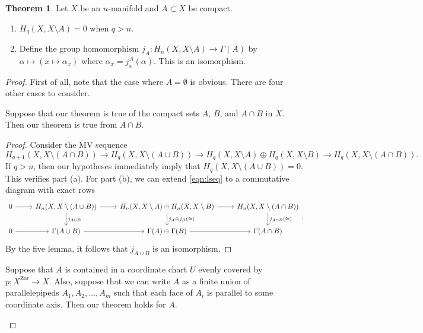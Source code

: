 \documentclass[10pt,letterpaper,cm]{nupset}
\theoremstyle{definition}
\theoremstyle{theorem}
\newtheorem{theorem}[definition]{Theorem}
\theoremstyle{remark}
\newcommand{\1}{\mathbb{1}}
\newcommand{\0}{\vec 0}
\begin{document}
\begin{theorem}
Let $X$ be an $n$-manifold and $A \subset X$ be compact.
\begin{enumerate}[label=(\alph*)]
\item $H_q(X, X \setminus A) =0$ when $q>n$.
\item Define the group homomorphism $j_A : H_n(X, X \setminus A) \to \Gamma(A)$ by $\alpha \mapsto \left(x \mapsto \alpha_x\right)$ where $\alpha_x = j_x^A(\alpha)$. This is an isomorphism.
\end{enumerate}
\end{theorem}
\begin{proof}  First of all, note that the case where $A = \emptyset$ is obvious. There are four other cases to consider. 
\begin{steps}
\item Suppose that our theorem is true of the compact sets $A$, $B$, and $A \cap B$ in $X$. Then our theorem is true from $A \cap B$.
\begin{proof}
Consider the MV sequence
\[ \label{eqn:lseq}
{H_{q+1}(X, X \setminus (A \cap B))} \to  {H_q(X, X \setminus (A \cup B))} \to {H_q(X, X \setminus A)\oplus H_q(X, X \setminus B)} \to {H_q(X, X \setminus (A \cap B))}
.\tag{$\star$}\] If $ q>n$, then our hypotheses immediately imply that $H_q(X, X \setminus (A \cup B)) =0$. This verifies part (a). For part (b), we can extend \eqref{eqn:lseq} to a commutative diagram with exact rows
\[
\begin{tikzcd}
0 \arrow[r] & {H_n(X, X \setminus (A \cup B))} \arrow[r] \arrow[d, "j_{A\cup B}"] & {H_n(X, X \setminus A)\oplus H_n(X, X \setminus B)} \arrow[r] \arrow[d, "j_A \oplus j_B(\cong)"] & {H_n(X, X \setminus (A \cap B))} \arrow[d, "j_{A\cap B}(\cong)"] \\
0 \arrow[r] & \Gamma(A \cup B) \arrow[r]                                        & \Gamma(A) \oplus \Gamma(B) \arrow[r]                                                             & \Gamma(A \cap B)                                              
\end{tikzcd}
.\] By the five lemma, it follows that $j_{A\cup B}$ is an isomorphism. 
\end{proof}
\item Suppose that $A$ is contained in a coordinate chart $U$ evenly covered by $p: X^{\mathrm{Zor}} \to X$. Also, suppose that we can write $A$ as a finite union of parallelepipeds $A_1, A_2, \ldots, A_m$ such that each face  of $A_i$ is parallel to some coordinate axis. Then our theorem holds for $A$.

\end{steps}
\end{proof}
\end{document}
